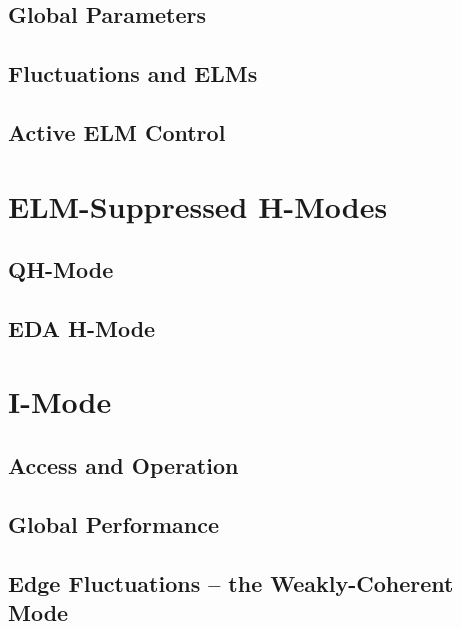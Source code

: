 \subsection{Global Parameters}\label{subsec:hcr_elmy_ped}

\subsection{Fluctuations and ELMs}\label{subsec:hcr_elmy_fluct}

\subsection{Active ELM Control}\label{subsec:hcr_elmy_control}

\nicesectionending

\section{ELM-Suppressed H-Modes}\label{sec:hcr_elmsuppressed}

\subsection{QH-Mode}\label{subsec:hcr_qh}

\subsection{EDA H-Mode}\label{subsec:hcr_eda}

\nicesectionending

\section{I-Mode}\label{sec:hcr_imode}

\subsection{Access and Operation}\label{subsec:hcr_imode_access}

\subsection{Global Performance}\label{subsec:hcr_imode_performance}

\subsection{Edge Fluctuations -- the Weakly-Coherent Mode}\label{subsec:hcr_imode_wcm}

\nicechapterending


